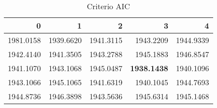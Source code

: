 \begin{table}[H]
\label{tab:autoarima_aic}
\centering
\begin{tabular}{rrrrr}
\toprule
0 & 1 & 2 & 3 & 4 \\
\midrule
1981.0158 & 1939.6620 & 1941.3115 & 1943.2209 & 1944.9339 \\
1942.4140 & 1941.3505 & 1943.2788 & 1945.1883 & 1946.8547 \\
1941.1070 & 1943.1068 & 1945.0487 & \textbf{1938.1438} & 1940.1096 \\
1943.1066 & 1945.1065 & 1941.6319 & 1940.1045 & 1944.7693 \\
1944.8736 & 1946.3898 & 1943.5636 & 1945.6314 & 1945.1468 \\
\bottomrule
\end{tabular}
\caption{Criterio AIC}
\end{table}
